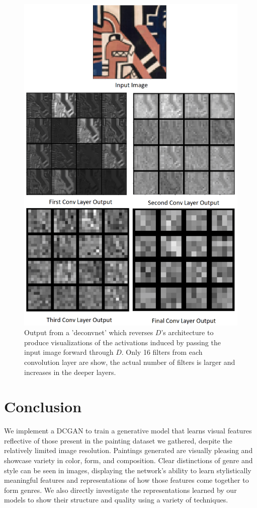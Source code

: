 \documentclass[10pt,twocolumn,letterpaper]{article}
\begin{document}
\begin{figure}[t]
	\begin{center}
		\includegraphics[width=0.675\linewidth]{deconv_full.png}
	\end{center}
	\caption{Output from a 'deconvnet' which reverses $ D $'s architecture to produce visualizations of the activations induced by passing the input image forward through $ D $. Only 16 filters from each convolution layer are show, the actual number of filters is larger and increases in the deeper layers.}
	\label{fig:long}
	\label{fig:onecol}
\end{figure}

\section{Conclusion}
We implement a DCGAN to train a generative model that learns visual features reflective of those present in the painting dataset we gathered, despite the relatively limited image resolution. Paintings generated are visually pleasing and showcase variety in color, form, and composition. Clear distinctions of genre and style can be seen in images, displaying the network's ability to learn stylistically meaningful features and representations of how those features come together to form genres. We also directly investigate the representations learned by our models to show their structure and quality using a variety of techniques.
\end{document}
